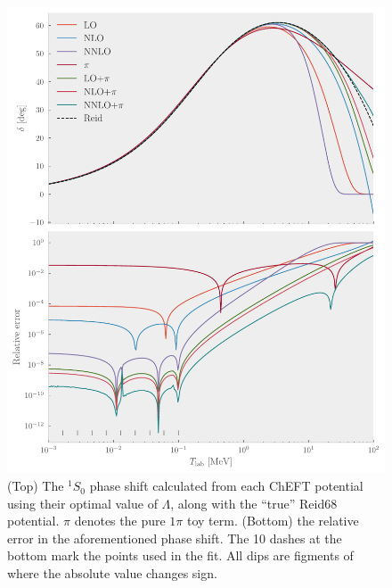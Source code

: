 \begin{figure}[pt]
  \centering
  \includegraphics{Figures/best_lambdas_reid.pdf}
  \caption{\label{fig:best_lambdas} (Top) The \(^{1}S_{0}\) phase shift
    calculated from each
    ChEFT potential using their optimal value of \(\Lambda\), along with the
    ``true'' Reid68 potential. \(\pi\) denotes the pure \(1\pi\) toy term. (Bottom) the
    relative error in the aforementioned phase shift. The 10 dashes at the
    bottom mark the points used in the fit. All dips are figments of where the
    absolute value changes sign.}
\end{figure}

